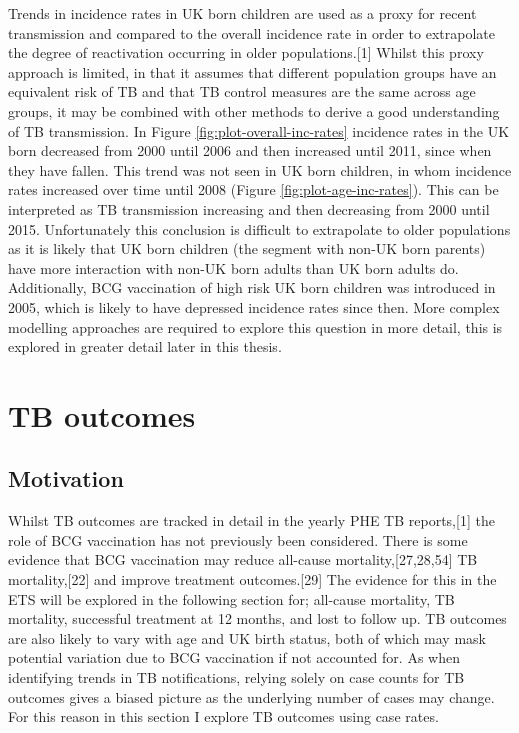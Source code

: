 \documentclass[11pt,twoside]{bristolthesis}
\begin{document}
  Trends in incidence rates in UK born children are used as a proxy for recent transmission and compared to the overall incidence rate in order to extrapolate the degree of reactivation occurring in older populations.{[}1{]} Whilst this proxy approach is limited, in that it assumes that different population groups have an equivalent risk of TB and that TB control measures are the same across age groups, it may be combined with other methods to derive a good understanding of TB transmission. In Figure \ref{fig:plot-overall-inc-rates} incidence rates in the UK born decreased from 2000 until 2006 and then increased until 2011, since when they have fallen. This trend was not seen in UK born children, in whom incidence rates increased over time until 2008 (Figure \ref{fig:plot-age-inc-rates}). This can be interpreted as TB transmission increasing and then decreasing from 2000 until 2015. Unfortunately this conclusion is difficult to extrapolate to older populations as it is likely that UK born children (the segment with non-UK born parents) have more interaction with non-UK born adults than UK born adults do. Additionally, BCG vaccination of high risk UK born children was introduced in 2005, which is likely to have depressed incidence rates since then. More complex modelling approaches are required to explore this question in more detail, this is explored in greater detail later in this thesis.
  
  \hypertarget{tb-outcomes}{%
  \section{TB outcomes}\label{tb-outcomes}}
  
  \hypertarget{motivation-1}{%
  \subsection{Motivation}\label{motivation-1}}
  
  Whilst TB outcomes are tracked in detail in the yearly PHE TB reports,{[}1{]} the role of BCG vaccination has not previously been considered. There is some evidence that BCG vaccination may reduce all-cause mortality,{[}27,28,54{]} TB mortality,{[}22{]} and improve treatment outcomes.{[}29{]} The evidence for this in the ETS will be explored in the following section for; all-cause mortality, TB mortality, successful treatment at 12 months, and lost to follow up. TB outcomes are also likely to vary with age and UK birth status, both of which may mask potential variation due to BCG vaccination if not accounted for. As when identifying trends in TB notifications, relying solely on case counts for TB outcomes gives a biased picture as the underlying number of cases may change. For this reason in this section I explore TB outcomes using case rates.
  
\end{document}
